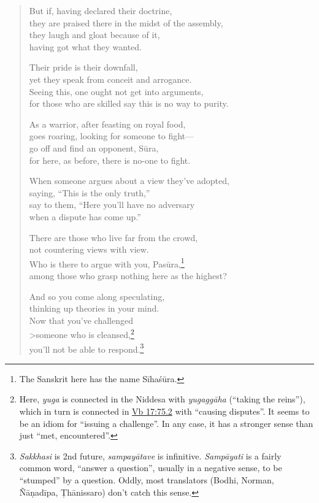 \documentclass[12pt,openany]{book}%
\begin{document}
\begin{verse}
But if, having declared their doctrine, \\
they are praised there in the midst of the assembly, \\
they laugh and gloat because of it, \\
having got what they wanted. 

Their pride is their downfall, \\
yet they speak from conceit and arrogance. \\
Seeing this, one ought not get into arguments, \\
for those who are skilled say this is no way to purity. 

As a warrior, after feasting on royal food, \\
goes roaring, looking for someone to fight—\\
go off and find an opponent, \textsanskrit{Sūra}, \\
for here, as before, there is no-one to fight. 

When someone argues about a view they’ve adopted, \\
saying, “This is the only truth,” \\
say to them, “Here you’ll have no adversary \\
when a dispute has come up.” 

There are those who live far from the crowd, \\
not countering views with view. \\
Who is there to argue with you, \textsanskrit{Pasūra},\footnote{The Sanskrit here has the name \textsanskrit{Sīhaśūra}. } \\
among those who grasp nothing here as the highest? 

And so you come along speculating, \\
thinking up theories in your mind. \\
Now that you’ve challenged \\>someone who is cleansed,\footnote{Here, \textit{yuga} is connected in the Niddesa with \textit{\textsanskrit{yugaggāha}} (“taking the reins”), which in turn is connected in \href{https://suttacentral.net/vb17/en/sujato\#75.2}{Vb 17:75.2} with “causing disputes”. It seems to be an idiom for “issuing a challenge”. In any case, it has a stronger sense than just “met, encountered”. } \\
you’ll not be able to respond.\footnote{\textit{Sakkhasi} is 2nd future, \textit{\textsanskrit{sampayātave}} is infinitive. \textit{\textsanskrit{Sampāyati}} is a fairly common word, “answer a question”, usually in a negative sense, to be “stumped” by a question. Oddly, most translators (Bodhi, Norman, \textsanskrit{Ñāṇadīpa}, \textsanskrit{Ṭhānissaro}) don’t catch this sense. } 

%
\end{verse}
\end{document}
